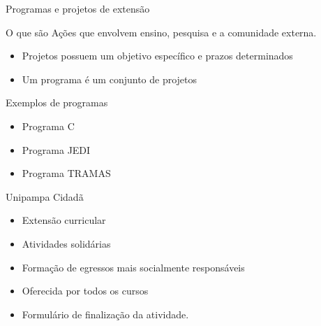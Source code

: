 \begin{frame}{{\sffamily Programas e projetos de extensão}}
  \begin{block}{O que são}
    Ações que envolvem ensino, pesquisa e a comunidade externa.
    \begin{itemize}
      \item Projetos possuem um objetivo específico e prazos determinados
      \item Um programa é um conjunto de projetos %
    \end{itemize}
  \end{block}

  \begin{block}{Exemplos de programas}
    \begin{itemize}
      \item Programa C
      \item Programa JEDI
      \item Programa TRAMAS
    \end{itemize}
  \end{block}

\end{frame}

\begin{frame}{{\sffamily Unipampa Cidadã}}
  \begin{block}{}
    \begin{itemize}
      \item Extensão curricular
      \item Atividades solidárias %
      \item Formação de egressos mais socialmente responsáveis %
      \item Oferecida por todos os cursos %
      \item Formulário de finalização da atividade.
    \end{itemize}
  \end{block}
\end{frame}
